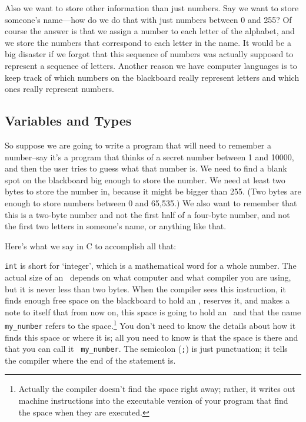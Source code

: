    Also we want to store other information than just numbers.  Say we
want to store someone's name---how do we do that with just numbers
between 0 and 255?  Of course the answer is that we assign a number to
each letter of the alphabet, and we store the numbers that correspond to
each letter in the name.  It would be a big disaster if we forgot that
this sequence of numbers was actually supposed to represent a sequence
of letters.  Another reason we have computer languages is to keep track
of which numbers on the blackboard really represent letters and which
ones really represent numbers.

\subsection{Variables and Types}

    So suppose we are going to write a program that will need to
remember a number--say it's a program that thinks of a secret number
between 1 and 10000, and then the user tries to guess what that number
is.  We need to find a blank spot on the blackboard big enough to store
the number.  We need at least two bytes to store the number in, because
it might be bigger than 255.  (Two bytes are enough to store numbers
between 0 and 65,535.)  We also want to remember that this is a two-byte
number and not the first half of a four-byte number, and not the first
two letters in someone's name, or anything like that.

    Here's what we say in C to accomplish all that:

\begin{flushleft}
\verb%    int my_number;%
\end{flushleft}

    {\tt int} is short for `integer', which is a mathematical word for a
whole number.  The actual size of an \int\ depends on what computer
and what compiler you are using, but it is never less than two bytes.
When the compiler sees this instruction, it finds enough free space on
the blackboard to hold an \int, reserves it, and makes a note to
itself that from now on, this space is going to hold an \int\ and
that the name {\tt my\_number} refers to the space.\footnote{Actually the
compiler doesn't find the space right away; rather, it writes out
machine instructions into the executable version of your program that
find the space when they are executed.} You don't need to know the
details about how it finds this space or where it is; all you need to
know is that the space is there and that you can call it {\tt
my\_number}.  The semicolon ({\tt;}) is just punctuation; it tells the
compiler where the end of the statement is.

